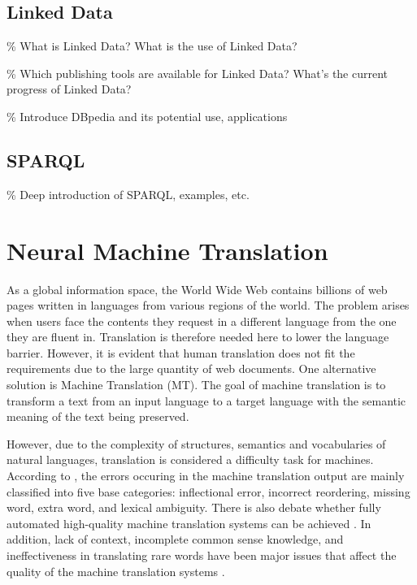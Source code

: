 \subsection{Linked Data} \label{subsection:linked data}
\% What is Linked Data? What is the use of Linked Data? 

\% Which publishing tools are available for Linked Data? What's the current progress of Linked Data?

\% Introduce DBpedia and its potential use, applications

\subsection{SPARQL} \label{subsection:sparql}
\% Deep introduction of SPARQL, examples, etc.


\section{Neural Machine Translation} \label{section:neural machine translation}
As a global information space, the World Wide Web contains billions of web pages written in languages from various regions of the world. The problem arises when users face the contents they request in a different language from the one they are fluent in. Translation is therefore needed here to lower the language barrier. However, it is evident that human translation does not fit the requirements due to the large quantity of web documents. One alternative solution is Machine Translation (MT). The goal of machine translation is to transform a text from an input language to a target language with the semantic meaning of the text being preserved.

However, due to the complexity of structures, semantics and vocabularies of natural languages, translation is considered a difficulty task for machines. According to \cite{Popovic2012}, the errors occuring in the machine translation output are mainly classified into five base categories: inflectional error, incorrect reordering, missing word, extra word, and lexical ambiguity. There is also debate whether fully automated high-quality machine translation systems can be achieved \cite{bar1964language}. In addition, lack of context, incomplete common sense knowledge, and ineffectiveness in translating rare words have been major issues that affect the quality of the machine translation systems \cite{okpor2014machine} \cite{Wu2016}.

